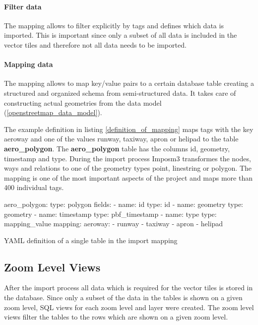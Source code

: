 \paragraph{Filter data} The mapping allows to filter explicitly by tags and defines which data is imported. This is important since only a subset of all \osm{} data is included in the vector tiles and  therefore not all \osm{} data needs to be imported.

\paragraph{Mapping data} The mapping allows to map \osm{} key/value pairs to a certain database table creating a structured and organized schema from semi-structured data. It takes care of constructing actual geometries from the \osm{} data model (\autoref{openstreetmap_data_model}).

\vskip 0.2in

The example definition in listing \autoref{definition_of_mapping} maps \osm{} tags with the key aeroway and one of the values runway, taxiway, apron or helipad to the table \textbf{aero\_polygon}. The \textbf{aero\_polygon} table has the columns id, geometry, timestamp and type. During the import process Imposm3 transformes the \osm{} nodes, ways and relations to one of the geometry types point, linestring or polygon. The mapping is one of the most important aspects of the project and maps more than 400 individual tags.

\begin{listing}[H]
\begin{yamlcode}
aero_polygon:
  type: polygon
  fields:
  - name: id
    type: id
  - name: geometry
    type: geometry
  - name: timestamp
    type: pbf_timestamp
  - name: type
    type: mapping_value
  mapping:
    aeroway:
    - runway
    - taxiway
    - apron
    - helipad
\end{yamlcode}
\caption{YAML definition of a single table in the import mapping}
\label{definition_of_mapping}
\end{listing}
\clearpage

\subsection{Zoom Level Views}\label{zoom_level_views}

After the import process all \osm{} data which is required for the vector tiles is stored in the database. Since only a subset of the data in the tables is shown on a given zoom level, SQL views for each zoom level and layer were created. The zoom level views filter the tables to the rows which are shown on a given zoom level.

